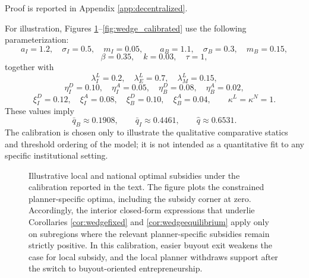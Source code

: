 Proof is reported in Appendix \ref{app:decentralized}.

For illustration, Figures \ref{fig:local_national_subsidies_calibrated}--\ref{fig:wedge_calibrated}
use the following parameterization:
\[
a_I=1.2,\quad \sigma_I=0.5,\quad m_I=0.05,
\qquad
a_B=1.1,\quad \sigma_B=0.3,\quad m_B=0.15,
\]
\[
\beta=0.35,\quad k=0.03,\quad \tau=1,
\]
together with
\[
\lambda_I^L=0.2,\quad \lambda_E^L=0.7,\quad \lambda_M^L=0.15,
\]
\[
\eta_I^D=0.10,\quad \eta_I^A=0.05,\quad \eta_B^D=0.08,\quad \eta_B^A=0.02,
\]
\[
\xi_I^D=0.12,\quad \xi_I^A=0.08,\quad \xi_B^D=0.10,\quad \xi_B^A=0.04,
\qquad
\kappa^L=\kappa^N=1.
\]
These values imply
\[
\bar q_B \approx 0.1908,\qquad
\bar q_I \approx 0.4461,\qquad
\hat q \approx 0.6531.
\]
The calibration is chosen only to illustrate the qualitative comparative statics and threshold ordering of the model; it is not intended as a quantitative fit to any specific institutional setting.

\begin{figure}[t]
\centering
{}
\caption{Illustrative local and national optimal subsidies under the calibration reported in the text. The figure plots the constrained planner-specific optima, including the subsidy corner at zero. Accordingly, the interior closed-form expressions that underlie Corollaries \ref{cor:wedgefixed} and \ref{cor:wedgeequilibrium} apply only on subregions where the relevant planner-specific subsidies remain strictly positive. In this calibration, easier buyout exit weakens the case for local subsidy, and the local planner withdraws support after the switch to buyout-oriented entrepreneurship.}
\label{fig:local_national_subsidies_calibrated}
\end{figure}

